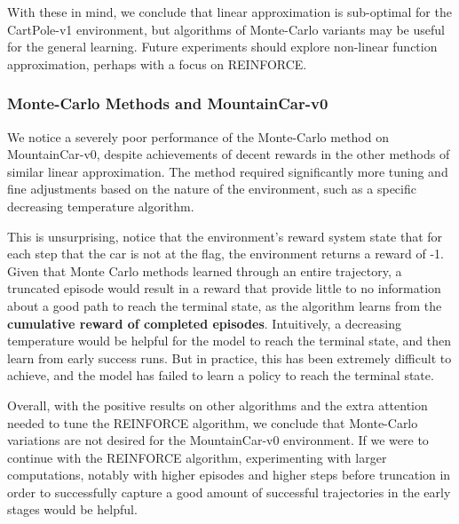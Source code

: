 \documentclass{article}
\begin{document}
With these in mind, we conclude that linear approximation is sub-optimal
for the CartPole-v1 environment, but algorithms of Monte-Carlo variants may be useful for the general learning.
Future experiments should explore non-linear function approximation, perhaps with a focus on REINFORCE.


\subsubsection{Monte-Carlo Methods and MountainCar-v0}
We notice a severely poor performance of the Monte-Carlo method on MountainCar-v0,
despite achievements of decent rewards in the other methods of similar linear approximation. The method required
significantly more tuning and fine adjustments based on the nature of the environment,
such as a specific decreasing temperature algorithm.

This is unsurprising, notice that the environment's reward system state that
for each step that the car is not at the flag, the environment returns a reward of -1.
Given that Monte Carlo methods learned through an entire trajectory, a truncated
episode would result in a reward that provide little to no information about a good path to
reach the terminal state, as the algorithm learns from the \textbf{cumulative reward of completed episodes}.
Intuitively, a decreasing temperature would be helpful for the model to reach the terminal state, and then learn from early success runs.
But in practice, this has been extremely difficult to achieve, and the model has failed to learn
a policy to reach the terminal state.

Overall, with the positive results on other algorithms and the extra attention needed to tune the
REINFORCE algorithm, we conclude that Monte-Carlo variations are not desired for the MountainCar-v0 environment.
If we were to continue with the REINFORCE algorithm, experimenting with larger
computations, notably with higher episodes and higher steps before truncation in order to successfully capture
a good amount of successful trajectories in the early stages would be helpful.

\newpage


\end{document}

